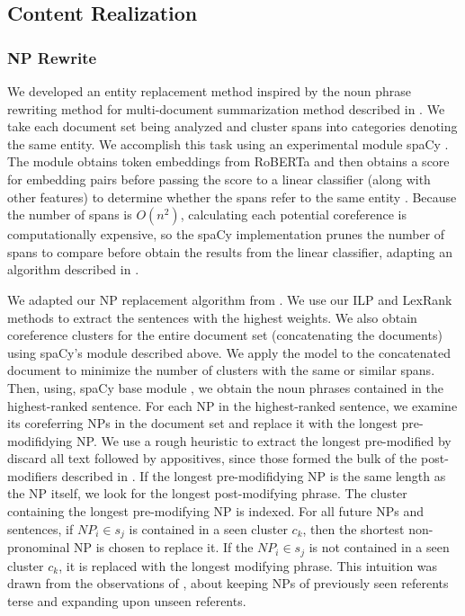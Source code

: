 
\subsection{Content Realization}

\subsubsection{NP Rewrite}
We developed an entity replacement method inspired by the noun phrase rewriting method for multi-document summarization method described in \citet{siddharthan-etal-2011-information}. We take each document set being analyzed and cluster spans into categories denoting  the same entity. We accomplish this task using an experimental module spaCy \cite{spacy}. The module obtains token embeddings from RoBERTa and then obtains a score for embedding pairs before passing the score to a linear classifier (along with other features) to determine whether the spans refer to the same entity \cite{spacycoref}. Because the number of spans is $O(n^2)$, calculating each potential coreference is computationally expensive, so the spaCy implementation prunes the number of spans to compare before obtain the results from the linear classifier, adapting an algorithm described in \cite{dobrovolskii-2021-word}.


We adapted our NP replacement algorithm from \citet{siddharthan-etal-2011-information}. We use our ILP and LexRank methods to extract the sentences with the highest weights. We also obtain coreference clusters for the entire document set (concatenating the documents) using spaCy's module described above. We apply the model to the concatenated document to minimize the number of clusters with the same or similar spans. Then, using, spaCy base module \cite{spacy}, we obtain the noun phrases contained in the highest-ranked sentence. For each NP in the highest-ranked sentence, we examine its coreferring NPs in the document set and replace it with the longest pre-modifidying NP. We use a rough heuristic to extract the longest pre-modified by discard all text followed by appositives, since those formed the bulk of the post-modifiers described in \citet{siddharthan-etal-2011-information}. If the longest pre-modifidying NP is the same length as the NP itself, we look for the longest post-modifying phrase. The cluster containing the longest pre-modifying NP is indexed. For all future NPs and sentences, if $NP_i \in s_j$ is contained in a seen cluster $c_k$, then the shortest non-pronominal NP is chosen to replace it. If the $NP_i \in s_j$ is not contained in a seen cluster $c_k$, it is replaced with the longest modifying phrase. This intuition was drawn from the observations of \citet{siddharthan-etal-2011-information}, about keeping NPs of previously seen referents terse and expanding upon unseen referents.

